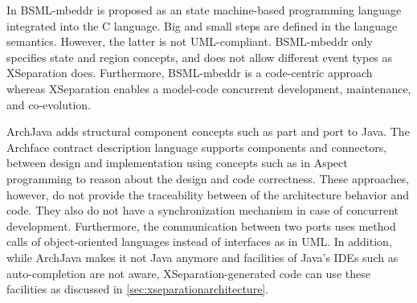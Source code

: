 In \cite{Luo:2016:BIS:2997364.2997372} BSML-mbeddr is proposed as an state machine-based programming language integrated into the C language.
Big and small steps are defined in the language semantics.
However, the latter is not UML-compliant. 
BSML-mbeddr only specifies state and region concepts, and does not allow different event types as XSeparation does. 
Furthermore, BSML-mbeddr is a code-centric approach whereas XSeparation enables a model-code concurrent development, maintenance, and co-evolution.  

ArchJava \cite{aldrich2002archjava} adds structural component concepts such as part and port to Java. %
The Archface \cite{ubayashi2010archface} contract description language supports components and connectors, between design and implementation using concepts such as  in Aspect programming to reason about the design and code correctness.
These approaches, however, do not provide the traceability between of the architecture behavior and code.
They also do not have a synchronization mechanism in case of concurrent development.
Furthermore, the communication between two ports uses method calls of object-oriented languages instead of interfaces as in UML.
In addition, while ArchJava makes it not Java anymore and facilities of Java's IDEs such as auto-completion are not aware, XSeparation-generated code can use these facilities as discussed in \ref{sec:xseparationarchitecture}.





%